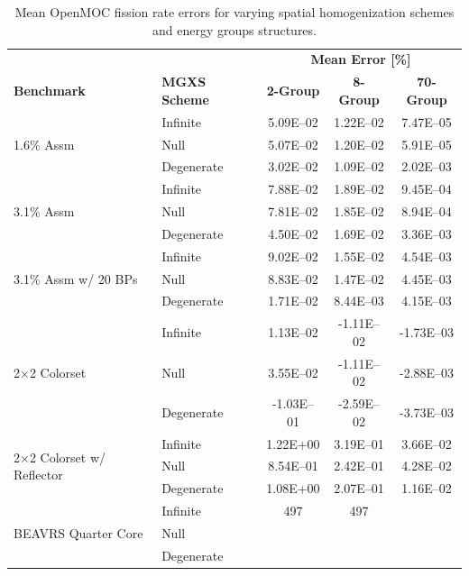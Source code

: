 \begin{table}[h!]
  \centering
  \caption[Mean OpenMOC fission rate errors]{Mean OpenMOC fission rate errors for varying spatial homogenization schemes and energy groups structures.}
  \small
  \label{table:chap8-openmoc-mean-fiss-rates}
  \vspace{6pt}
  \begin{tabular}{l l c c c}
  \toprule
  \rowcolor{lightgray}
  & & \multicolumn{3}{c}{\cellcolor{lightgray} \textbf{Mean Error [\%]}} \\
  \multirow{-2}{*}{\cellcolor{lightgray} \bf Benchmark} &
  \multirow{-2}{*}{\cellcolor{lightgray} \bf \ac{MGXS} Scheme} &
  \multicolumn{1}{c}{{\cellcolor{lightgray} \bf 2-Group}} &
  \multicolumn{1}{c}{{\cellcolor{lightgray} \bf 8-Group}} &
  \multicolumn{1}{c}{{\cellcolor{lightgray} \bf 70-Group}} \\
  \midrule
\multirow{3}{*}{\parbox{2.5cm}{1.6\% Assm}} & Infinite & 5.09E--02 & 1.22E--02 & 7.47E--05 \\
& Null & 5.07E--02 & 1.20E--02 & 5.91E--05 \\
& Degenerate & 3.02E--02 & 1.09E--02 & 2.02E--03 \\
  \midrule
\multirow{3}{*}{\parbox{2.5cm}{3.1\% Assm}} & Infinite & 7.88E--02 & 1.89E--02 & 9.45E--04 \\
& Null & 7.81E--02 & 1.85E--02 & 8.94E--04 \\
& Degenerate & 4.50E--02 & 1.69E--02 & 3.36E--03 \\
  \midrule
\multirow{3}{*}{\parbox{2.5cm}{3.1\% Assm w/ 20 BPs}} & Infinite & 9.02E--02 & 1.55E--02 & 4.54E--03 \\
& Null & 8.83E--02 & 1.47E--02 & 4.45E--03 \\
& Degenerate & 1.71E--02 & 8.44E--03 & 4.15E--03 \\
  \midrule
\multirow{3}{*}{\parbox{2.5cm}{2$\times$2 Colorset}} & Infinite & 1.13E--02 & -1.11E--02 & -1.73E--03 \\
& Null & 3.55E--02 & -1.11E--02 & -2.88E--03 \\
& Degenerate & -1.03E--01 & -2.59E--02 & -3.73E--03 \\
  \midrule
\multirow{3}{*}{\parbox{2.5cm}{2$\times$2 Colorset w/ Reflector}} & Infinite & 1.22E+00 & 3.19E--01 & 3.66E--02 \\
& Null & 8.54E--01 & 2.42E--01 & 4.28E--02 \\
& Degenerate & 1.08E+00 & 2.07E--01 & 1.16E--02 \\
  \midrule
  \multirow{3}{*}{\parbox{2cm}{\ac{BEAVRS} Quarter Core}} & Infinite & 497 & 497 & \\
  & Null & & & \\
  & Degenerate & & & \\
  \bottomrule
\end{tabular}
\end{table}

